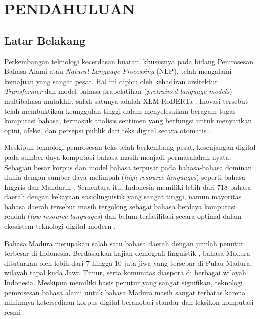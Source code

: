
\chapter{PENDAHULUAN}

\section{Latar Belakang}

Perkembangan teknologi kecerdasan buatan, khususnya pada bidang Pemrosesan Bahasa Alami atau \textit{Natural Language Processing} (NLP), telah mengalami kemajuan yang sangat pesat. Hal ini dipicu oleh kehadiran arsitektur \textit{Transformer} dan model bahasa prapelatihan (\textit{pretrained language models}) multibahasa mutakhir, salah satunya adalah XLM-RoBERTa \citep{darnoto2026language, luther2026analisis}. Inovasi tersebut telah membuktikan keunggulan tinggi dalam menyelesaikan beragam tugas komputasi bahasa, termasuk analisis sentimen yang berfungsi untuk menyarikan opini, afeksi, dan persepsi publik dari teks digital secara otomatis \citep{aribowo2021cross, setiawan2023sentiment}.

Meskipun teknologi pemrosesan teks telah berkembang pesat, kesenjangan digital pada sumber daya komputasi bahasa masih menjadi permasalahan nyata. Sebagian besar korpus dan model bahasa terpusat pada bahasa-bahasa dominan dunia dengan sumber daya melimpah (\textit{high-resource languages}) seperti bahasa Inggris dan Mandarin \citep{cahyawijaya2023nusawrites}. Sementara itu, Indonesia memiliki lebih dari 718 bahasa daerah dengan kekayaan sosiolinguistik yang sangat tinggi, namun mayoritas bahasa daerah tersebut masih tergolong sebagai bahasa berdaya komputasi rendah (\textit{low-resource languages}) dan belum terfasilitasi secara optimal dalam ekosistem teknologi digital modern \citep{aji2022one}.

Bahasa Madura merupakan salah satu bahasa daerah dengan jumlah penutur terbesar di Indonesia. Berdasarkan kajian demografi linguistik \citep{aji2022one}, bahasa Madura dituturkan oleh lebih dari 7 hingga 10 juta jiwa yang tersebar di Pulau Madura, wilayah tapal kuda Jawa Timur, serta komunitas diaspora di berbagai wilayah Indonesia. Meskipun memiliki basis penutur yang sangat signifikan, teknologi pemrosesan bahasa alami untuk bahasa Madura masih sangat terbatas karena minimnya ketersediaan korpus digital beranotasi standar dan leksikon komputasi resmi \citep{cahyawijaya2021indo4b}.

